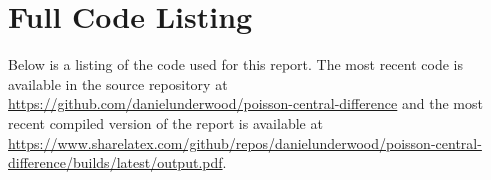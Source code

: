 \documentclass[10pt,a4paper]{article}
\begin{document}
\newpage
\section*{Full Code Listing}

Below is a listing of the code used for this report. The most recent code is available in the source repository at \url{https://github.com/danielunderwood/poisson-central-difference} and the most recent compiled version of the report is available at \url{https://www.sharelatex.com/github/repos/danielunderwood/poisson-central-difference/builds/latest/output.pdf}.




\end{document}
